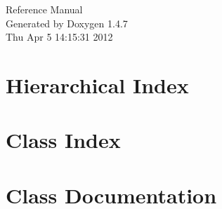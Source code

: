 \documentclass[a4paper]{book}
\begin{document}
\begin{titlepage}
\vspace*{7cm}
\begin{center}
{\Large Reference Manual}\\
\vspace*{1cm}
{\large Generated by Doxygen 1.4.7}\\
\vspace*{0.5cm}
{\small Thu Apr 5 14:15:31 2012}\\
\end{center}
\end{titlepage}
\clearemptydoublepage
{}
\tableofcontents
\clearemptydoublepage
{}
\chapter{Hierarchical Index}

\chapter{Class Index}

\chapter{Class Documentation}




























\printindex
\end{document}
